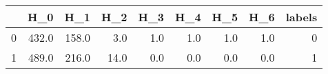 \begin{tabular}{lrrrrrrrr}
\toprule
{} &    H\_0 &    H\_1 &   H\_2 &  H\_3 &  H\_4 &  H\_5 &  H\_6 &  labels \\
\midrule
0 &  432.0 &  158.0 &   3.0 &  1.0 &  1.0 &  1.0 &  1.0 &       0 \\
1 &  489.0 &  216.0 &  14.0 &  0.0 &  0.0 &  0.0 &  0.0 &       1 \\
\bottomrule
\end{tabular}
